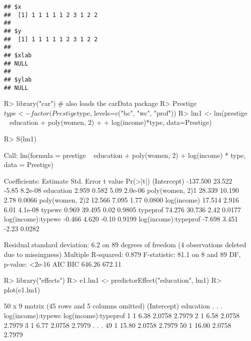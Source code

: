 \documentclass[
]{article}
\begin{document}
\begin{verbatim}
## $x
##  [1] 1 1 1 1 1 2 3 1 2 2
## 
## $y
##  [1] 1 1 1 1 1 2 3 1 2 2
## 
## $xlab
## NULL
## 
## $ylab
## NULL
\end{verbatim}

\begin{Schunk}
\begin{Sinput}
R> library("car") # also loads the carData package
R> Prestige$type <- factor(Prestige$type, levels=c("bc", "wc", "prof"))
R> lm1 <- lm(prestige ~ education + poly(women, 2) +
+                log(income)*type, data=Prestige)
\end{Sinput}
\end{Schunk}
\begin{Schunk}
\begin{Sinput}
R> S(lm1)
\end{Sinput}
\begin{Soutput}
Call: lm(formula = prestige ~ education + poly(women, 2) + log(income) * type,
         data = Prestige)

Coefficients:
                     Estimate Std. Error t value Pr(>|t|)
(Intercept)          -137.500     23.522   -5.85  8.2e-08
education               2.959      0.582    5.09  2.0e-06
poly(women, 2)1        28.339     10.190    2.78   0.0066
poly(women, 2)2        12.566      7.095    1.77   0.0800
log(income)            17.514      2.916    6.01  4.1e-08
typewc                  0.969     39.495    0.02   0.9805
typeprof               74.276     30.736    2.42   0.0177
log(income):typewc     -0.466      4.620   -0.10   0.9199
log(income):typeprof   -7.698      3.451   -2.23   0.0282

Residual standard deviation: 6.2 on 89 degrees of freedom
  (4 observations deleted due to missingness)
Multiple R-squared: 0.879
F-statistic: 81.1 on 8 and 89 DF,  p-value: <2e-16 
   AIC    BIC 
646.26 672.11 
\end{Soutput}
\end{Schunk}
\begin{Schunk}
\begin{Sinput}
R> library("effects")
R> e1.lm1 <- predictorEffect("education", lm1)
R> plot(e1.lm1)
\end{Sinput}
\end{Schunk}
\begin{Schunk}
\begin{Soutput}
50 x 9 matrix (45 rows and 5 columns omitted)
   (Intercept) education . . . log(income):typewc log(income):typeprof
1            1      6.38                   2.0758               2.7979
2            1      6.58                   2.0758               2.7979
3            1      6.77                   2.0758               2.7979
. . .                                                                      
49           1     15.80                   2.0758               2.7979
50           1     16.00                   2.0758               2.7979
\end{Soutput}
\end{Schunk}
\end{document}
